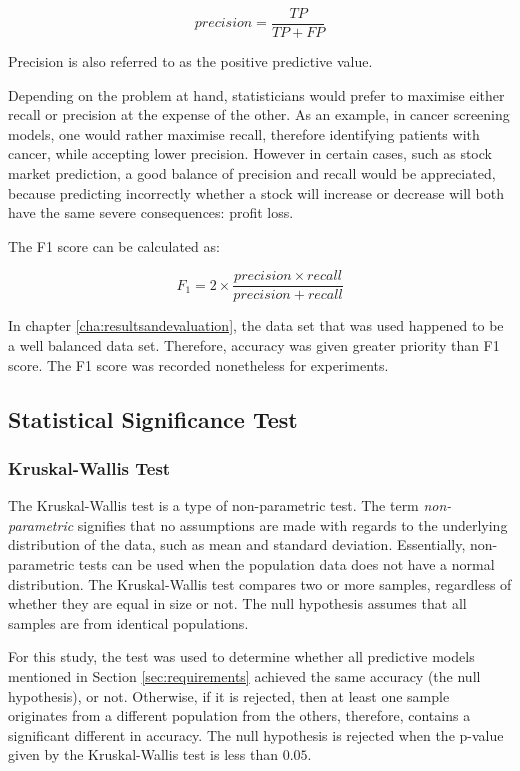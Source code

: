 \documentclass{UoYCSproject}
\begin{document}
\begin{equation}
precision=\frac{TP}{TP + FP}
\end{equation}

Precision is also referred to as the positive predictive value.

Depending on the problem at hand, statisticians would prefer to maximise either recall or precision at the expense of the other. As an example, in cancer screening models, one would rather maximise recall, therefore identifying patients with cancer, while accepting lower precision. However in certain cases, such as stock market prediction, a good balance of precision and recall would be appreciated, because predicting incorrectly whether a stock will increase or decrease will both have the same severe consequences: profit loss.

The F1 score can be calculated as:

\begin{equation}
\label{eq:f1}
F_1=2 \times \frac{precision \times recall}{precision + recall}
\end{equation}

In chapter \ref{cha:resultsandevaluation}, the data set that was used happened to be a well balanced data set. Therefore, accuracy was given greater priority than F1 score. The F1 score was recorded nonetheless for experiments.  

\subsection{Statistical Significance Test}
\label{sec:statisticalsignificancetest}
\subsubsection{Kruskal-Wallis Test}
The Kruskal-Wallis test is a type of non-parametric test. The term \textit{non-parametric} signifies that no assumptions are made with regards to the underlying distribution of the data, such as mean and standard deviation. Essentially, non-parametric tests can be used when the population data does not have a normal distribution. The Kruskal-Wallis test compares two or more samples, regardless of whether they are equal in size or not. The null hypothesis assumes that all samples are from identical populations.  

For this study, the test was used to determine whether all predictive models mentioned in Section \ref{sec:requirements} achieved the same accuracy (the null hypothesis), or not.  Otherwise, if it is rejected, then at least one sample originates from a different population from the others, therefore, contains a significant different in accuracy. The null hypothesis is rejected when the p-value given by the Kruskal-Wallis test is less than $0.05$.
\end{document}
